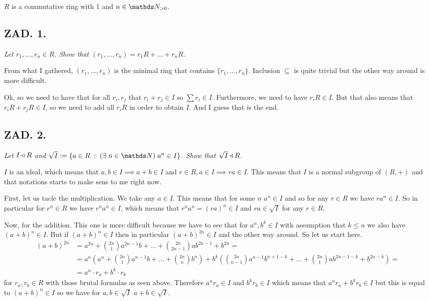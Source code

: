 \documentclass{article}[13pt]
\begin{document}
$R$ is a commutative ring with 1 and $n\in\N_{>0}$.

\subsection*{ZAD. 1.}
\emph{Let $r_1,...,r_n\in R$. Show that $(r_1,...,r_n)=r_1R+...+r_nR$.}
\medskip

\medskip

From what I gathered, $(r_1,...,r_n)$ is the minimal ring that contains $\{r_1,...,r_n\}$. Inclusion $\subseteq$ is quite trivial but the other way around is more difficult.
\medskip

Ok, so we need to have that for all $r_i,r_j$ that $r_i+r_j\in I$ so $\sum r_i\in I$. Furthermore, we need to have $r_iR\in I$. But that also means that $r_iR+r_jR\in I$, so we need to add all $r_iR$ in order to obtain $I$. And I guess that is the end.

\subsection*{ZAD. 2.}
\emph{Let $I\triangleleft R$ and $\sqrt{I}:=\{a\in R\;:\;(\exists\;n\in \N)\;a^n\in I\}$. Show that $\sqrt{I}\triangleleft R$.}
\medskip

\medskip

$I$ is an ideal, which means that $a,b\in I\implies a+b\in I$ and $r\in R,a\in I\implies ra\in I$. This means that $I$ is a normal subgroup of $(R, +)$ and that notations starts to make sens to me right now.
\smallskip

First, let us tacle the multiplication. We take any $a\in I$. This means that for some $n$ $a^n\in I$ and so for any $r\in R$ we have $ra^n\in I$. So in particular for $r^n\in R$ we have $r^na^n\in I$, which means that $r^na^n=(ra)^n\in I$ and $ra\in\sqrt{I}$ for any $r\in R$.
\smallskip

Now, for the addition. This one is more difficult because we have to see that for $a^n, b^k\in I$ with assumption that $k\leq n$ we also have $(a+b)^n\in I$. But if $(a+b)^n\in I$ then in particular $(a+b)^{2n}\in I$ and the other way around. So let us start here. 
\begin{align*}
    (a+b)^{2n}&=a^{2n}+{2n\choose 1}a^{2n-1}b+...+{2n\choose 2n-1}ab^{2n-1}+b^{2n}=\\
    &=a^n(a^n+{2n\choose 1}a^{n-1}b+...+{2n\choose n}b^n)+b^k({2n\choose n-1}a^{n-1}b^{n+1-k}+...+{2n\choose 1}ab^{2n-1-k}+b^{2n-k})=\\
    &=a^n\cdot r_a+b^k\cdot r_b
\end{align*}
for $r_a,r_b\in R$ with those brutal formulas as seen above. Therefore $a^nr_a\in I$ and $b^kr_b\in I$ which means that $a^nr_a+b^kr_b\in I$ but this is equal to $(a+b)^n\in I$ so we have for $a,b\in\sqrt{I}$ $a+b\in\sqrt{I}$.
\end{document}
